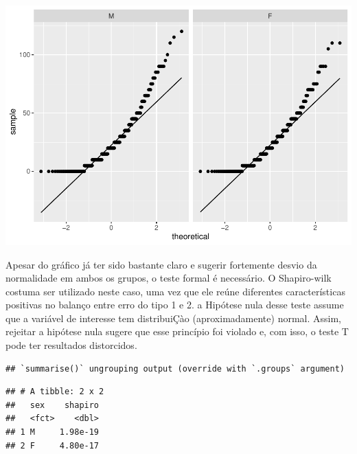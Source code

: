 \documentclass[
]{book}
\newenvironment{Shaded}{\begin{snugshade}}{\end{snugshade}}
\newcommand{\DataTypeTok}[1]{\textcolor[rgb]{0.13,0.29,0.53}{#1}}
\newcommand{\DecValTok}[1]{\textcolor[rgb]{0.00,0.00,0.81}{#1}}
\newcommand{\KeywordTok}[1]{\textcolor[rgb]{0.13,0.29,0.53}{\textbf{#1}}}
\newcommand{\NormalTok}[1]{#1}
\newcommand{\OperatorTok}[1]{\textcolor[rgb]{0.81,0.36,0.00}{\textbf{#1}}}
\newcommand{\StringTok}[1]{\textcolor[rgb]{0.31,0.60,0.02}{#1}}
\begin{document}
\begin{center}\includegraphics{gitbook-demo_files/figure-latex/unnamed-chunk-33-1} \end{center}

Apesar do gráfico já ter sido bastante claro e sugerir fortemente desvio da normalidade em ambos os grupos, o teste formal é necessário. O Shapiro-wilk costuma ser utilizado neste caso, uma vez que ele reúne diferentes características positivas no balanço entre erro do tipo 1 e 2. a Hipótese nula desse teste assume que a variável de interesse tem distribuiÇào (aproximadamente) normal. Assim, rejeitar a hipótese nula sugere que esse princípio foi violado e, com isso, o teste T pode ter resultados distorcidos.

\begin{Shaded}
\end{Shaded}

\begin{verbatim}
## `summarise()` ungrouping output (override with `.groups` argument)
\end{verbatim}

\begin{verbatim}
## # A tibble: 2 x 2
##   sex    shapiro
##   <fct>    <dbl>
## 1 M     1.98e-19
## 2 F     4.80e-17
\end{verbatim}
\end{document}
